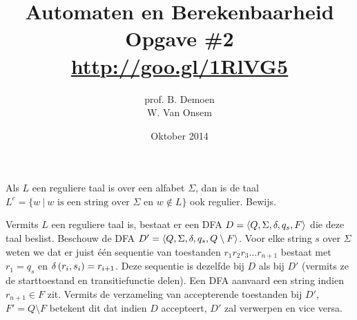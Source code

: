 \documentclass[a4paper]{article}
\title{Automaten en Berekenbaarheid\\Opgave \#2\\\url{http://goo.gl/1RlVG5}}
\author{prof. B. Demoen\\W. Van Onsem}
\date{Oktober 2014}
\begin{document}
\maketitle

\begin{question}
Als $L$ een reguliere taal is over een alfabet $\Sigma$, dan is de taal $L^c = \{ w \ | \ \mbox{$w$  is een string over $\Sigma$ en $w \not\in L$} \}$ ook regulier. Bewijs.
\begin{answer}
Vermits $L$ een reguliere taal is, bestaat er een DFA $D=\left\langle Q,\Sigma,\delta,q_s,F \right\rangle$ die deze taal beslist. Beschouw de DFA $D'=\left\langle Q,\Sigma,\delta,q_s,Q\setminus F \right\rangle$. Voor elke string $s$ over $\Sigma$ weten we dat er juist \'e\'en sequentie van toestanden $r_1r_2r_3\ldots r_{n+1}$ bestaat met $r_1=q_s$ en $\delta\left( r_i,s_i \right)=r_{i+1}$. Deze sequentie is dezelfde bij $D$ als bij $D'$ (vermits ze de starttoestand en transitiefunctie delen). Een DFA aanvaard een string indien $r_{n+1}\in F$ zit. Vermits de verzameling van accepterende toestanden bij $D'$, $F'=Q\setminus F$ betekent dit dat indien $D$ accepteert, $D'$ zal verwerpen en vice versa.
\end{answer}
\end{question}
\end{document}

